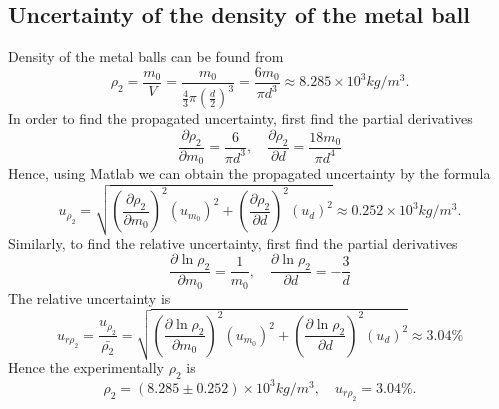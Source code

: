 \subsection{Uncertainty of the density of the metal ball}
    Density of the metal balls can be found from
    \[
        \rho_2=\frac{m_0}{V}=\frac{m_0}{\frac{4}{3}\pi(\frac{d}{2})^3}=\frac{6m_0}{\pi d^3}\approx 8.285\times10^3 kg/m^3.
    \]
    In order to find the propagated uncertainty, first find the partial derivatives
    \[
        \frac{\partial\rho_2}{\partial m_0}=\frac{6}{\pi d^3},\quad
        \frac{\partial\rho_2}{\partial d}=\frac{18m_0}{\pi d^4}
    \]
    Hence, using Matlab we can obtain the propagated uncertainty by the formula
    \[
        u_{\rho_2}=\sqrt{(\frac{\partial\rho_2}{\partial m_0})^2(u_{m_0})^2+(\frac{\partial\rho_2}{\partial d})^2(u_d)^2}\approx 0.252\times10^3kg/m^3.
    \]
    Similarly, to find the relative uncertainty, first find the partial derivatives
    \[
        \frac{\partial\ln\rho_2}{\partial m_0}=\frac{1}{m_0},\quad
        \frac{\partial\ln\rho_2}{\partial d}=-\frac{3}{d}
    \]
    The relative uncertainty is
    \[
        u_{r\rho_2}=\frac{u_{\rho_2}}{\bar{\rho_2}}=\sqrt{(\frac{\partial \ln\rho_2}{\partial m_0})^2(u_{m_0})^2+(\frac{\partial \ln\rho_2}{\partial d})^2(u_d)^2}\approx 3.04\%
    \]
    Hence the experimentally $\rho_2$ is
    \[
        \rho_2=(8.285\pm 0.252)\times10^3kg/m^3, \quad u_{r\rho_2}=3.04\%.
    \]

